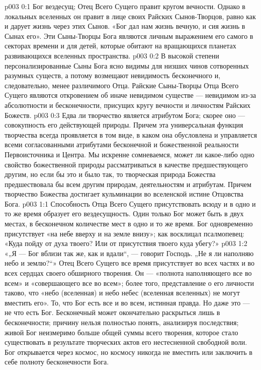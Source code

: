 \author{Божественный Советник}
\vs p003 0:1 Бог вездесущ; Отец Всего Сущего правит кругом вечности. Однако в локальных вселенных он правит в лице своих Райских Сынов\hyp{}Творцов, равно как и дарует жизнь через этих Сынов. «Бог дал нам жизнь вечную, и сия жизнь в Сынах его». Эти Сыны\hyp{}Творцы Бога являются личным выражением его самого в секторах времени и для детей, которые обитают на вращающихся планетах развивающихся вселенных пространства.
\vs p003 0:2 В высокой степени персонализированные Сыны Бога ясно видимы для низших чинов сотворенных разумных существ, а потому возмещают невидимость бесконечного и, следовательно, менее различимого Отца. Райские Сыны\hyp{}Творцы Отца Всего Сущего являются откровением об иначе невидимом существе --- невидимом из\hyp{}за абсолютности и бесконечности, присущих кругу вечности и личностям Райских Божеств.
\vs p003 0:3 \pc Едва ли творчество является атрибутом Бога; скорее оно --- совокупность его действующей природы. Причем эта универсальная функция творчества всегда проявляется в том виде, в каком она обусловлена и управляется всеми согласованными атрибутами бесконечной и божественной реальности Первоисточника и Центра. Мы искренне сомневаемся, может ли какое\hyp{}либо одно свойство божественной природы рассматриваться в качестве предшествующего другим, но если бы это и было так, то творческая природа Божества предшествовала бы всем другим природам, деятельностям и атрибутам. Причем творчество Божества достигает кульминации во вселенской истине Отцовства Бога.
\vs p003 1:1 Способность Отца Всего Сущего присутствовать всюду и в одно и то же время образует его вездесущность. Один только Бог может быть в двух местах, в бесконечном количестве мест в одно и то же время. Бог одновременно присутствует «на небе вверху и на земле внизу»; как восклицал псалмопевец: «Куда пойду от духа твоего? Или от присутствия твоего куда убегу?»
\vs p003 1:2 «„Я --- Бог вблизи так же, как и вдали“, --- говорит Господь. „Не я ли наполняю небо и землю?“» Отец Всего Сущего все время присутствует во всех частях и во всех сердцах своего обширного творения. Он --- «полнота наполняющего все во всем» и «совершающего все во всем»; более того, представление о его личности таково, что «небо (вселенная) и небо небес (вселенная вселенных) не могут вместить его». То, что Бог есть все и во всем, истинная правда. Но даже это --- не  что есть Бог. Бесконечный может окончательно раскрыться лишь в бесконечности; причину нельзя полностью понять, анализируя последствия; живой Бог неизмеримо больше общей суммы всего творения, которое стало существовать в результате творческих актов его нестесненной свободной воли. Бог открывается через космос, но космосу никогда не вместить или заключить в себе полноту бесконечности Бога.
